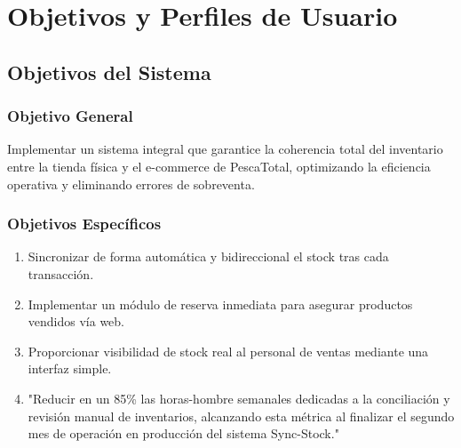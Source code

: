 \documentclass[12pt,a4paper]{article}
\begin{document}
\section{Objetivos y Perfiles de Usuario}

\subsection{Objetivos del Sistema}
\subsubsection{Objetivo General}
Implementar un sistema integral que garantice la coherencia total del inventario entre la tienda física y el e-commerce de PescaTotal, optimizando la eficiencia operativa y eliminando errores de sobreventa.

\subsubsection{Objetivos Específicos}
\begin{enumerate}
    \item Sincronizar de forma automática y bidireccional el stock tras cada transacción.
    \item Implementar un módulo de reserva inmediata para asegurar productos vendidos vía web.
    \item Proporcionar visibilidad de stock real al personal de ventas mediante una interfaz simple.
    \item "Reducir en un 85\% las horas-hombre semanales dedicadas a la conciliación y revisión manual de inventarios, alcanzando esta métrica al finalizar el segundo mes de operación en producción del sistema Sync-Stock."
\end{enumerate}
\end{document}
